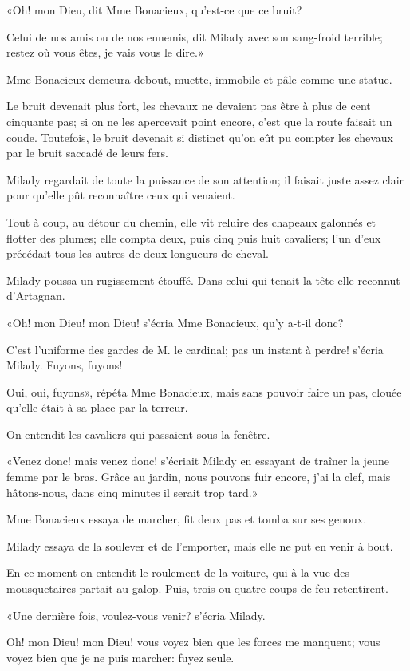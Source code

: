 «Oh! mon Dieu, dit Mme Bonacieux, qu'est-ce que ce bruit? 

\speak  Celui de nos amis ou de nos ennemis, dit Milady avec son sang-froid terrible; restez où vous êtes, je vais vous le dire.» 

Mme Bonacieux demeura debout, muette, immobile et pâle comme une statue. 

Le bruit devenait plus fort, les chevaux ne devaient pas être à plus de cent cinquante pas; si on ne les apercevait point encore, c'est que la route faisait un coude. Toutefois, le bruit devenait si distinct qu'on eût pu compter les chevaux par le bruit saccadé de leurs fers. 

Milady regardait de toute la puissance de son attention; il faisait juste assez clair pour qu'elle pût reconnaître ceux qui venaient. 

Tout à coup, au détour du chemin, elle vit reluire des chapeaux galonnés et flotter des plumes; elle compta deux, puis cinq puis huit cavaliers; l'un d'eux précédait tous les autres de deux longueurs de cheval. 

Milady poussa un rugissement étouffé. Dans celui qui tenait la tête elle reconnut d'Artagnan. 

«Oh! mon Dieu! mon Dieu! s'écria Mme Bonacieux, qu'y a-t-il donc? 

\speak  C'est l'uniforme des gardes de M. le cardinal; pas un instant à perdre! s'écria Milady. Fuyons, fuyons! 

\speak  Oui, oui, fuyons», répéta Mme Bonacieux, mais sans pouvoir faire un pas, clouée qu'elle était à sa place par la terreur. 

On entendit les cavaliers qui passaient sous la fenêtre. 

«Venez donc! mais venez donc! s'écriait Milady en essayant de traîner la jeune femme par le bras. Grâce au jardin, nous pouvons fuir encore, j'ai la clef, mais hâtons-nous, dans cinq minutes il serait trop tard.» 

Mme Bonacieux essaya de marcher, fit deux pas et tomba sur ses genoux. 

Milady essaya de la soulever et de l'emporter, mais elle ne put en venir à bout. 

En ce moment on entendit le roulement de la voiture, qui à la vue des mousquetaires partait au galop. Puis, trois ou quatre coups de feu retentirent. 

«Une dernière fois, voulez-vous venir? s'écria Milady. 

\speak  Oh! mon Dieu! mon Dieu! vous voyez bien que les forces me manquent; vous voyez bien que je ne puis marcher: fuyez seule. 

